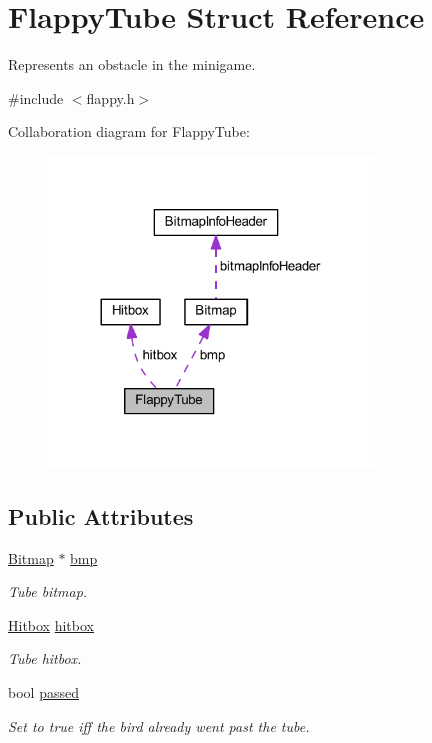 \hypertarget{struct_flappy_tube}{}\section{Flappy\+Tube Struct Reference}
\label{struct_flappy_tube}


Represents an obstacle in the minigame.  




{\ttfamily \#include $<$flappy.\+h$>$}



Collaboration diagram for Flappy\+Tube\+:\nopagebreak
\begin{figure}[H]
\begin{center}
\leavevmode
\includegraphics[width=245pt]{struct_flappy_tube__coll__graph}
\end{center}
\end{figure}
\subsection*{Public Attributes}
\begin{DoxyCompactItemize}
\item 
\mbox{\hyperlink{struct_bitmap}{Bitmap}} $\ast$ \mbox{\hyperlink{group__flappy_ga7baae1562a0fdd78f0fdf9bc095d11b7}{bmp}}
\begin{DoxyCompactList}\small\item\em Tube bitmap. \end{DoxyCompactList}\item 
\mbox{\hyperlink{struct_hitbox}{Hitbox}} \mbox{\hyperlink{group__flappy_ga6c57c0cbff50d942c40410631ae3eba2}{hitbox}}
\begin{DoxyCompactList}\small\item\em Tube hitbox. \end{DoxyCompactList}\item 
bool \mbox{\hyperlink{group__flappy_ga70babf0470365a943ad6743479a05726}{passed}}
\begin{DoxyCompactList}\small\item\em Set to true iff the bird already went past the tube. \end{DoxyCompactList}\end{DoxyCompactItemize}


